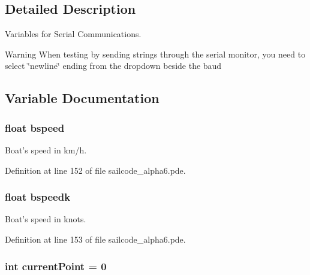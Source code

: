 \subsection{\-Detailed \-Description}
\-Variables for \-Serial \-Communications. \begin{DoxyWarning}{\-Warning}
\-When testing by sending strings through the serial monitor, you need to select \char`\"{}newline\char`\"{} ending from the dropdown beside the baud 
\end{DoxyWarning}


\subsection{\-Variable \-Documentation}
\hypertarget{group__group1_ga3c5844d05a57a968ed5686a10e4a5af8}{
\subsubsection[{bspeed}]{\setlength{\rightskip}{0pt plus 5cm}float {\bf bspeed}}}
\label{group__group1_ga3c5844d05a57a968ed5686a10e4a5af8}


\-Boat's speed in km/h. 



\-Definition at line 152 of file sailcode\-\_\-alpha6.\-pde.

\hypertarget{group__group1_ga6ebc5b99dfacc747433709383f3bea8c}{
\subsubsection[{bspeedk}]{\setlength{\rightskip}{0pt plus 5cm}float {\bf bspeedk}}}
\label{group__group1_ga6ebc5b99dfacc747433709383f3bea8c}


\-Boat's speed in knots. 



\-Definition at line 153 of file sailcode\-\_\-alpha6.\-pde.

\hypertarget{group__group1_ga9c43dea25777e23791d530b06f6715f1}{
\subsubsection[{current\-Point}]{\setlength{\rightskip}{0pt plus 5cm}int {\bf current\-Point} = 0}}
\label{group__group1_ga9c43dea25777e23791d530b06f6715f1}


